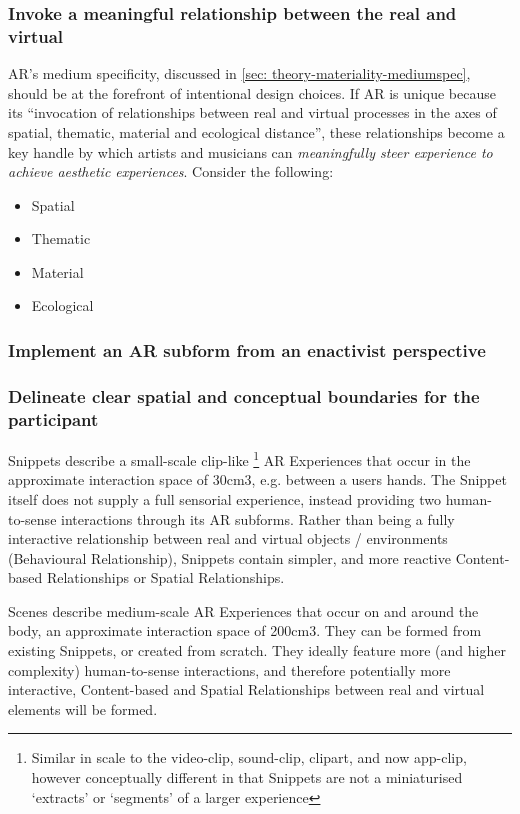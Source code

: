 \subsubsection{Invoke a meaningful relationship between the real and virtual}
AR's medium specificity, discussed in \autoref{sec: theory-materiality-mediumspec}, should be at the forefront of intentional design choices. If AR is unique because its ``invocation of relationships between real and virtual processes in the axes of spatial, thematic, material and ecological distance'', these relationships become a key handle by which artists and musicians can \textit{meaningfully steer experience to achieve aesthetic experiences}. Consider the following:
\begin{itemize}
    \item Spatial \\
    \item Thematic \\
    \item Material \\
    \item Ecological \\
\end{itemize}

\subsubsection{Implement an AR subform from an enactivist perspective}

\subsubsection{Delineate clear spatial and conceptual boundaries for the participant}
Snippets describe a small-scale clip-like \footnote{Similar in scale to the video-clip, sound-clip, clipart, and now app-clip, however conceptually different in that Snippets are not a miniaturised `extracts' or `segments' of a larger experience} AR Experiences that occur in the approximate interaction space of 30cm3, e.g. between a users hands. The Snippet itself does not supply a full sensorial experience, instead providing two human- to-sense interactions through its AR subforms. Rather than being a fully interactive relationship between real and virtual objects / environments (Behavioural Relationship), Snippets contain simpler, and more reactive Content-based Relationships or Spatial Relationships.

Scenes describe medium-scale AR Experiences that occur on and around the body, an approximate interaction space of 200cm3. They can be formed from existing Snippets, or created from scratch. They ideally feature more (and higher complexity) human-to-sense interactions, and therefore potentially more interactive, Content-based and Spatial Relationships between real and virtual elements will be formed.


